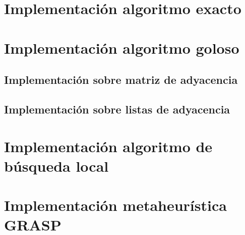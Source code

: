 \lstset{breaklines=true}

\newpage
\section{Implementación algoritmo exacto}


\newpage
\section{Implementación algoritmo goloso}

\subsection{Implementación sobre matriz de adyacencia}


\subsection{Implementación sobre listas de adyacencia}


\newpage
\section{Implementación algoritmo de búsqueda local}


\newpage
\section{Implementación metaheurística GRASP}

